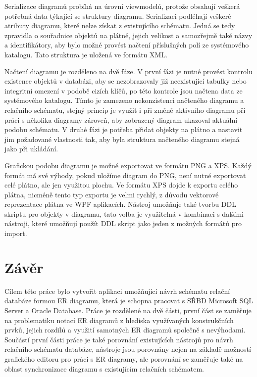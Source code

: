 \documentclass[czech,bachelor,public,dept460,male,oneside]{diploma}
\begin{document}
	Serializace diagramů probíhá na úrovní viewmodelů, protože obsahují veškerá potřebná data týkající se struktury diagramu. Serializaci podléhají veškeré atributy diagramu, které nelze získat z existujícího schématu. Jedná se tedy zpravidla o souřadnice objektů na plátně, jejich velikost a samozřejmě také názvy a identifikátory, aby bylo možné provést načtení příslušných polí ze systémového katalogu. Tato struktura je uložená ve formátu XML.
	
	Načtení diagramu je rozděleno na dvě fáze. V první fázi je nutné provést kontrolu existence objektů v databázi, aby se nezobrazovaly již neexistující tabulky nebo integritní omezení v podobě cizích klíčů, po této kontrole jsou načtena data ze systémového katalogu. Tímto je zamezeno nekonzistenci načteného diagramu a relačního schématu, stejný princip je využit i při změně aktivního diagramu při práci s několika diagramy zároveň, aby zobrazený diagram ukazoval aktuální podobu schématu. V druhé fázi je potřeba přidat objekty na plátno a nastavit jim požadované vlastnosti tak, aby byla struktura načteného diagramu stejná jako při ukládání.
	
	Grafickou podobu diagramu je možné exportovat ve formátu PNG a XPS. Každý formát má své výhody, pokud uložíme diagram do PNG, není nutné exportovat celé plátno, ale jen využitou plochu. Ve formátu XPS dojde k exportu celého plátna, nicméně tento typ exportu je velmi rychlý, z důvodu vektorové reprezentace plátna ve WPF aplikacích. Nástroj umožňuje také tvorbu DDL skriptu pro objekty v diagramu, tato volba je využitelná v kombinaci s dalšími nástroji, které umožňují použít DDL skript jako jeden z možných formátů pro import.

\newpage
\section{Závěr}
Cílem této práce bylo vytvořit aplikaci umožňující návrh schématu relační databáze formou ER diagramu, která je schopna pracovat s SŘBD Microsoft SQL Server a Oracle Database. Práce je rozdělené na dvě části, první část se zaměřuje na problematiku notací ER diagramů z hlediska využívaných konstrukčních prvků, jejich rozdílů a využití samotných ER diagramů společně s nevýhodami. Součástí první části práce je také porovnání existujících nástrojů pro návrh relačního schématu databáze, nástroje jsou porovnány nejen na základě možností grafického editoru pro práci s ER diagramy, ale porovnání se zaměřuje také na oblast synchronizace diagramu s existujícím relačních schématem.
\end{document}
